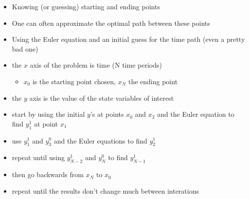\documentclass[notes=show]{beamer}
\begin{document}
\begin{frame}%


\begin{itemize}
\item Knowing (or guessing) starting and ending points

\item One can often approximate the optimal path between these points

\item Using the Euler equation and an initial guess for the time path (even
a pretty bad one)

\item the $x$ axis of the problem is time (N time periods)

\begin{itemize}
\item $x_{0}$ is the starting point chosen, $x_{N}$ the ending point
\end{itemize}

\item the $y$ axis is the value of the state variables of interest

\item start by using the initial $y$'s at points $x_{0}$ and $x_{2}$ and the
Euler equation to find $y_{1}^{1}$ at point $x_{1}$

\item use $y_{1}^{1}$ and $y_{3}^{0}$ and the Euler equations to find $%
y_{2}^{1}$

\item repeat until using $y_{N-2}^{1}$ and $y_{N}^{0}$ to find $y_{N-1}^{1}$

\item then go backwards from $x_{N}$ to $x_{0}$

\item repeat until the results don't change much between interations
\end{itemize}

\end{frame}%
\end{document}
